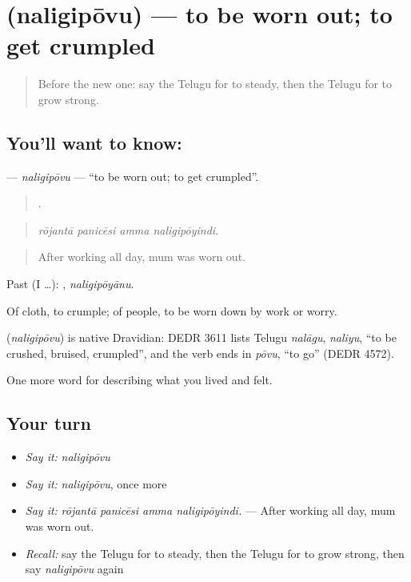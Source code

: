 \section[\texorpdfstring{\te{నలిగిపోవు} (naligipōvu)}{నలిగిపోవు (naligipōvu)}]{ (naligipōvu) — to be worn out; to get crumpled}

\label{lesson:TE-C520-naligipovu}



\begin{quote}
Before the new one: say the Telugu for to steady, then the Telugu for to grow strong.
\end{quote}

\subsection*{You'll want to know: }
\textbf{} — \emph{naligipōvu} — \textquotedblleft{}to be worn out; to get crumpled\textquotedblright{}.

\begin{quote}
   .
\end{quote}

\begin{quote}
\emph{rōjantā panicēsi amma naligipōyindi.}
\end{quote}

\begin{quote}
After working all day, mum was worn out.
\end{quote}

Past (I …): , \emph{naligipōyānu}.

Of cloth, to crumple; of people, to be worn down by work or worry.

\begin{cousinweb}
\textbf{} (\emph{naligipōvu}) is native Dravidian: DEDR 3611 lists Telugu \emph{nalāgu}, \emph{naliyu}, \textquotedblleft{}to be crushed, bruised, crumpled\textquotedblright{}, and the verb ends in \emph{pōvu}, \textquotedblleft{}to go\textquotedblright{} (DEDR 4572).
\end{cousinweb}

\begin{grammarlens}[title={What you've built}]
One more word for describing what you lived and felt.
\end{grammarlens}

\subsection*{Your turn}
\begin{itemize}
\raggedright
  \item \emph{Say it:} \emph{naligipōvu}
  \item \emph{Say it:} \emph{naligipōvu}, once more
  \item \emph{Say it:} \emph{rōjantā panicēsi amma naligipōyindi.} — After working all day, mum was worn out.
  \item \emph{Recall:} say the Telugu for to steady, then the Telugu for to grow strong, then say \emph{naligipōvu} again
\end{itemize}

